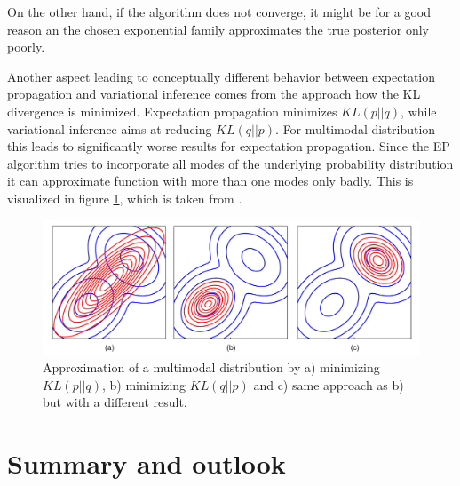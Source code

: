 \documentclass{sigkdd}
\begin{document}
On the other hand, if the algorithm does not converge, it might be for a good reason an the chosen exponential family approximates the true posterior only poorly.

Another aspect leading to conceptually different behavior between expectation propagation and variational inference comes from the approach how the KL divergence is minimized. Expectation propagation minimizes $KL(p||q)$, while variational inference aims at reducing $KL(q||p)$. For multimodal distribution this leads to significantly worse results for expectation propagation. Since the EP algorithm tries to incorporate all modes of the underlying probability distribution it can approximate function with more than one modes only badly. This is visualized in figure \ref{fig:multimodal}, which is taken from \cite{bishop2006prml}.

\begin{figure}[h]
	\begin{center}
		\includegraphics[scale=0.12]{multimodal_approximation.png}
		\caption{Approximation of a multimodal distribution by a) minimizing $KL(p||q)$, b) minimizing $KL(q||p)$ and c) same approach as b) but with a different result.}\label{fig:multimodal}
	\end{center}
\end{figure}
\section{Summary and outlook}



\nocite{*}
\end{document}
